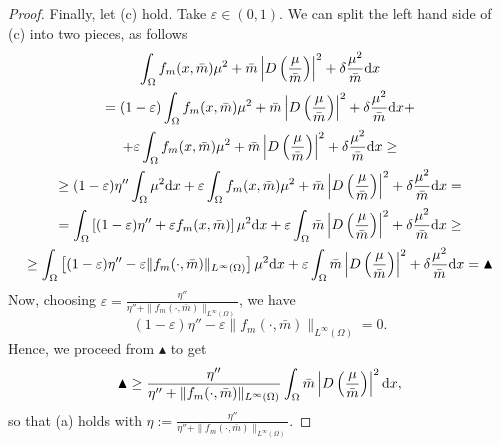 \documentclass[10pt,a4paper,nouppercase,nowrite]{article}
\numberwithin{equation}{section}
\newcommand{\di}{{\rm d}}
\newcommand{\eps}{\varepsilon}
\theoremstyle{definition}
\begin{document}
\begin{proof}
	Finally, let (c) hold. Take $\eps \in (0,1)$. We can split the left hand side of (c) into two pieces, as follows
	\begin{multline*}
			\int_{\Omega} f_m(x,\bar{m}) \mu^2 +  \bar{m} \left| D\left( \frac{\mu}{\bar{m}} \right) \right|^2 + \delta \frac{\mu^2}{\bar{m}} \di x \\=(1-\eps) \int_{\Omega} f_m(x,\bar{m}) \mu^2 +  \bar{m} \left| D\left( \frac{\mu}{\bar{m}} \right) \right|^2 + \delta \frac{\mu^2}{\bar{m}} \di x + \\+  \eps \int_{\Omega} f_m (x,\bar{m}) \mu^2 +  \bar{m} \left| D\left( \frac{\mu}{\bar{m}} \right) \right|^2 + \delta \frac{\mu^2}{\bar{m}} \di x \geq
			\\\geq (1-\eps)\eta'' \int_{\Omega} \mu^2 \di x + \eps \int_{\Omega} f_m(x,\bar{m}) \mu^2 +  \bar{m} \left| D\left( \frac{\mu}{\bar{m}} \right) \right|^2 + \delta \frac{\mu^2}{\bar{m}} \di x=\\=\int_{\Omega} \left[ (1-\eps)\eta'' + \eps f_m(x,\bar{m}) \right] \mu^2 \di x + \eps \int_{\Omega} \bar{m} \left| D\left( \frac{\mu}{\bar{m}} \right) \right|^2 + \delta \frac{\mu^2}{\bar{m}} \di x \geq \\ \geq \int_{\Omega} \left[ (1-\eps)\eta'' - \eps \|f_m(\cdot,\bar{m})\|_{L^{\infty}(\Omega)} \right] \mu^2 \di x + \eps \int_{\Omega} \bar{m} \left| D\left( \frac{\mu}{\bar{m}} \right) \right|^2 + \delta \frac{\mu^2}{\bar{m}} \di x = \blacktriangle
	\end{multline*}
	Now, choosing $\eps=\frac{\eta''}{\eta'' + \| f_m(\cdot,\bar{m})\|_{L^{\infty}(\Omega)}}$, we have
	$$(1-\eps)\eta'' - \eps \| f_m(\cdot,\bar{m})\|_{L^{\infty}(\Omega)} = 0.
	$$
	Hence, we proceed from $\blacktriangle$ to get
	\begin{equation*}
		\blacktriangle \geq \frac{\eta''}{\eta'' + \|f_m(\cdot,\bar{m})\|_{L^{\infty}(\Omega)}} \int_{\Omega} \bar{m} \left| D \left( \frac{\mu}{\bar{m}} \right) \right|^2 \di x,
	\end{equation*}
	so that (a) holds with $\eta:=\frac{\eta''}{\eta'' + \|f_m(\cdot,\bar{m})\|_{L^{\infty}(\Omega)}}$.
\end{proof}
\end{document}
